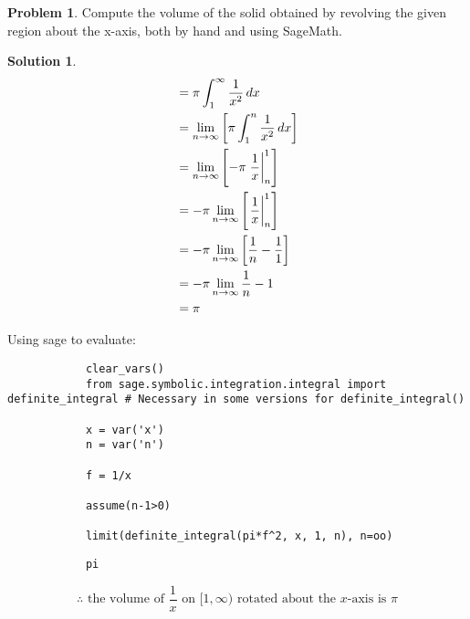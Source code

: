\documentclass[10pt]{article}
\makeatletter
\theoremstyle{definition}
\newtheorem{problem}{Problem}
\newtheorem{soln}{Solution}
\newcommand{\boxspacing}{\kern\kvtcb@left@rule\kern\kvtcb@boxsep}
\newcommand{\prompt}[4]{
    \ttfamily\llap{{\color{#2}[#3]:\hspace{3pt}#4}}\vspace{-\baselineskip}
}
\makeatother
\begin{document}
\begin{problem}
Compute the volume of the solid obtained by revolving the given region about the x-axis, both
by hand and using SageMath.
\end{problem}
\begin{soln}
    \begin{align*}
         & = \pi\int_{1}^{\infty} \frac{1}{x^2} \,dx                               \\
         & = \lim_{n \to \infty}  \left[\pi\int_{1}^{n} \frac{1}{x^2} \,dx \right] \\
         & = \lim_{n \to \infty}  \left[-\pi\evaluated{\frac{1}{x}}_{n}^{1}\right] \\
         & = -\pi\lim_{n \to \infty}  \left[\evaluated{\frac{1}{x}}_{n}^{1}\right] \\
         & = -\pi\lim_{n \to \infty}  \left[\frac{1}{n}-\frac{1}{1}\right]         \\
         & = -\pi\lim_{n \to \infty}  \frac{1}{n}-1                                \\
         & = \pi                                                                   \\
    \end{align*}

    \noindent Using sage to evaluate:
    \begin{tcolorbox}[breakable, size=fbox, boxrule=1pt, pad at break*=1mm,colback=cellbackground, colframe=cellborder]
        \prompt{In}{incolor}{2}{\boxspacing}
        \begin{verbatim}
            clear_vars()
            from sage.symbolic.integration.integral import definite_integral # Necessary in some versions for definite_integral()
            
            x = var('x')
            n = var('n')
            
            f = 1/x
            
            assume(n-1>0)
            
            limit(definite_integral(pi*f^2, x, 1, n), n=oo)
        \end{verbatim}
    \end{tcolorbox}
    \begin{tcolorbox}[breakable, size=fbox, boxrule=.5pt, pad at break*=1mm, opacityfill=0]
        \prompt{Out}{outcolor}{2}{\boxspacing}
        \begin{verbatim}
            pi
        \end{verbatim}
    \end{tcolorbox}

    $$\therefore \text{ the volume of } \frac{1}{x} \text{ on } [1,\infty) \text{ rotated about the } x \text{-axis} \text{ is } \pi$$
\end{soln}
\end{document}
